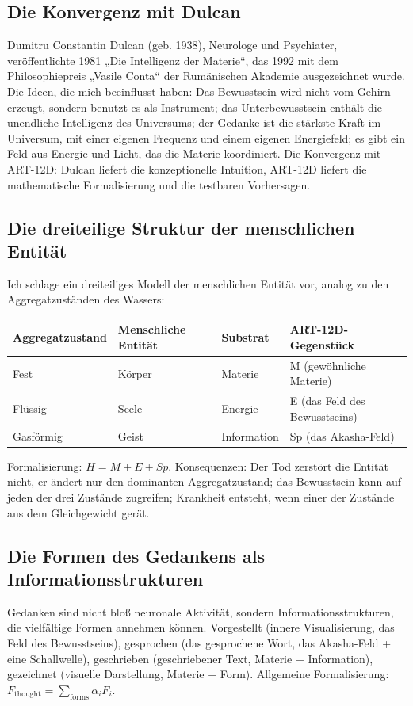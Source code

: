 \documentclass[11pt,a4paper]{article}
\begin{document}
\subsection{Die Konvergenz mit Dulcan}
Dumitru Constantin Dulcan (geb. 1938), Neurologe und Psychiater, veröffentlichte 1981 „Die Intelligenz der Materie``, das 1992 mit dem Philosophiepreis „Vasile Conta`` der Rumänischen Akademie ausgezeichnet wurde. Die Ideen, die mich beeinflusst haben: Das Bewusstsein wird nicht vom Gehirn erzeugt, sondern benutzt es als Instrument; das Unterbewusstsein enthält die unendliche Intelligenz des Universums; der Gedanke ist die stärkste Kraft im Universum, mit einer eigenen Frequenz und einem eigenen Energiefeld; es gibt ein Feld aus Energie und Licht, das die Materie koordiniert. Die Konvergenz mit ART-12D: Dulcan liefert die konzeptionelle Intuition, ART-12D liefert die mathematische Formalisierung und die testbaren Vorhersagen.

\subsection{Die dreiteilige Struktur der menschlichen Entität}
Ich schlage ein dreiteiliges Modell der menschlichen Entität vor, analog zu den Aggregatzuständen des Wassers:
\begin{table}[H]
\centering
\begin{tabular}{@{}llll@{}}
\toprule
\textbf{Aggregatzustand} & \textbf{Menschliche Entität} & \textbf{Substrat} & \textbf{ART-12D-Gegenstück} \\ \midrule
Fest & Körper & Materie & M (gewöhnliche Materie) \\
Flüssig & Seele & Energie & E (das Feld des Bewusstseins) \\
Gasförmig & Geist & Information & Sp (das Akasha-Feld) \\ \bottomrule
\end{tabular}
\end{table}
Formalisierung: $H = M + E + Sp$. Konsequenzen: Der Tod zerstört die Entität nicht, er ändert nur den dominanten Aggregatzustand; das Bewusstsein kann auf jeden der drei Zustände zugreifen; Krankheit entsteht, wenn einer der Zustände aus dem Gleichgewicht gerät.

\subsection{Die Formen des Gedankens als Informationsstrukturen}
Gedanken sind nicht bloß neuronale Aktivität, sondern Informationsstrukturen, die vielfältige Formen annehmen können. Vorgestellt (innere Visualisierung, das Feld des Bewusstseins), gesprochen (das gesprochene Wort, das Akasha-Feld + eine Schallwelle), geschrieben (geschriebener Text, Materie + Information), gezeichnet (visuelle Darstellung, Materie + Form). Allgemeine Formalisierung: $F_{\text{thought}} = \sum_{\text{forms}} \alpha_i F_i$.
\end{document}
